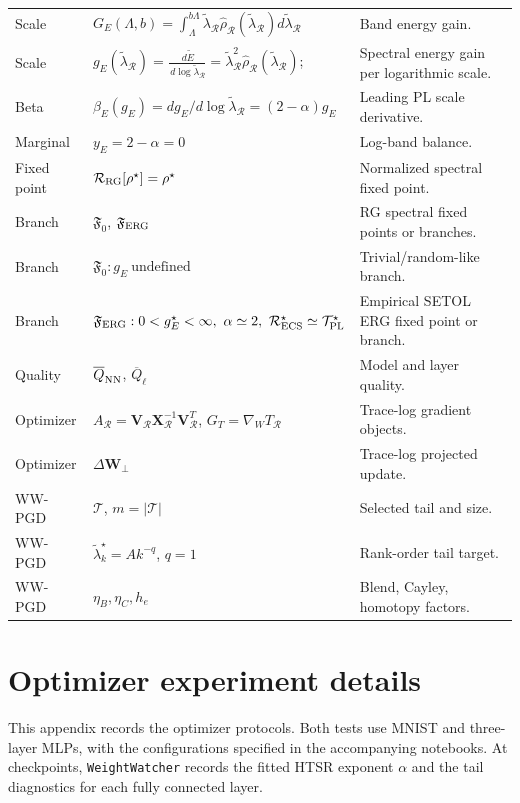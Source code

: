 \documentclass[10pt,twocolumn]{article}
\newcommand{\WW}{\texttt{WeightWatcher}}
\newcommand{\Fzero}{\mathfrak F_0}
\newcommand{\Ferg}{\mathfrak F_{\rm ERG}}
\newcommand{\dd}{\,d}
\newcommand{\W}{\mathbf W}
\newcommand{\V}{\mathbf V}
\newcommand{\XR}{\mathbf X_{\mathcal R}}
\newcommand{\Rell}{\mathcal R}
\newcommand{\Tell}{\mathcal T}
\newcommand{\TPL}{\mathcal T_{\rm PL}}
\newcommand{\RECS}{\mathcal R_{\rm ECS}}
\newcommand{\rhohat}{\widehat\rho}
\newcommand{\Ered}{\widetilde{E}}
\begin{document}
\begin{center}
{\begin{tabular}{@{}lll@{}}
Scale & $G_E(\Lambda,b)=\int_{\Lambda}^{b\Lambda}\tilde{\lambda}_{\Rell}\rhohat_{\Rell}(\tilde{\lambda}_{\Rell})d\tilde{\lambda}_{\Rell}$ & Band energy gain. \\
Scale & $\displaystyle g_E(\tilde{\lambda}_{\Rell})=\frac{\dd\Ered}{\dd\log\tilde{\lambda}_{\Rell}}=\tilde{\lambda}_{\Rell}^2\rhohat_{\Rell}(\tilde{\lambda}_{\Rell})$;  & Spectral energy  gain per logarithmic scale. \\
Beta & $\beta_E(g_E)=d g_E/d\log\tilde{\lambda}_{\Rell}=(2-\alpha)g_E$ & Leading PL scale derivative. \\
Marginal & $y_E=2-\alpha=0$ & Log-band balance. \\
Fixed point & $\Rell_{\rm RG}[\rho^\star]=\rho^\star$ & Normalized spectral fixed point. \\
Branch & $\Fzero$, $\Ferg$ & RG spectral fixed points or branches. \\
Branch & $\Fzero:g_E\ \text{undefined}$ & Trivial/random-like branch. \\
Branch & $\Ferg:0<g_E^\star<\infty,\ \alpha\simeq2,\ \RECS^\star\simeq\TPL^\star$ & Empirical SETOL ERG fixed point or branch. \\
Quality & $\overline Q_{\rm NN}$, $\overline Q_\ell$ & Model and layer quality. \\
Optimizer & $A_{\Rell}=\V_{\Rell}\XR^{-1}\V_{\Rell}^T$, $G_T=\nabla_W T_{\Rell}$ & Trace-log gradient objects. \\
Optimizer & $\Delta\W_\perp$ & Trace-log projected update. \\
WW-PGD & $\Tell$, $m=|\Tell|$ & Selected tail and size. \\
WW-PGD & $\tilde{\lambda}_k^\star=A k^{-q}$, $q=1$ & Rank-order tail target. \\
WW-PGD & $\eta_B,\eta_C,h_e$ & Blend, Cayley, homotopy factors. \\
\bottomrule
\end{tabular}}
\end{center}
\clearpage

\appendix
\section{Optimizer experiment details}
\label{app:optimizer_experiments}
\small

This appendix records the optimizer protocols.
Both tests use MNIST and three-layer MLPs, with the configurations specified in the accompanying notebooks.
At checkpoints, \WW{} records the fitted HTSR exponent $\alpha$ and the tail diagnostics for each fully connected layer.
\end{document}
